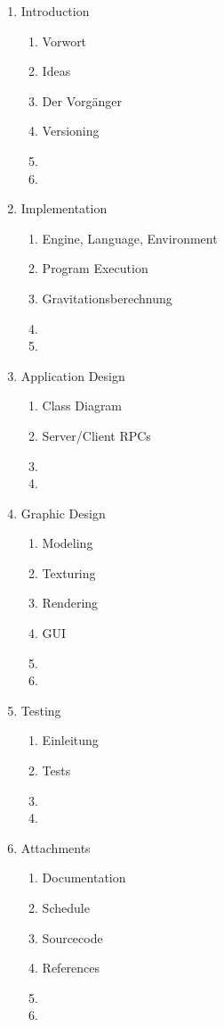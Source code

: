 \documentclass[a4paper]{article}
\begin{document}
\begin{enumerate}
  \item Introduction
  \begin{enumerate}
    \item Vorwort
    \item Ideas
    \item Der Vorgänger
    \item Versioning
    \item 
    \item 
  \end{enumerate}
  \item Implementation
  \begin{enumerate}
    \item Engine, Language, Environment
    \item Program Execution
    \item Gravitationsberechnung
    \item 
    \item 
  \end{enumerate}
  \item Application Design
  \begin{enumerate}
    \item Class Diagram
    \item Server/Client RPCs
    \item 
    \item 
  \end{enumerate}
  \item Graphic Design
  \begin{enumerate}
    \item Modeling
    \item Texturing
    \item Rendering
    \item GUI
    \item 
    \item 
  \end{enumerate}
  \item Testing
  \begin{enumerate}
    \item Einleitung
    \item Tests
    \item 
    \item 
  \end{enumerate}
  \item Attachments
  \begin{enumerate}
    \item Documentation
    \item Schedule
    \item Sourcecode
    \item References
    \item 
    \item 
  \end{enumerate}
\end{enumerate}
\end{document}
